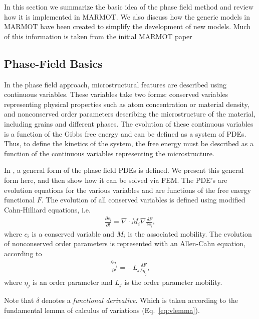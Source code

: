 \documentclass[letter,12pt,fleqn]{article}
\begin{document}
In this section we summarize the basic idea of the phase field method and review how it is implemented in MARMOT. We also discuss how the generic models in MARMOT have been created to simplify the development of new models. Much of this information is taken from the initial MARMOT paper \cite{tonks2011marmot}

\subsection{Phase-Field Basics}
\label{sec:phasefield}

In the phase field approach, microstructural features are described using continuous variables.  These variables take two forms: conserved variables representing physical properties such as atom concentration or material density, and nonconserved order parameters describing the microstructure of the material, including grains and different phases.  The evolution of these continuous variables is a function of the Gibbs free energy and can be defined as a system of PDEs. Thus, to define the kinetics of the system, the free energy must be described as a function of the continuous variables representing the microstructure. 
 
In \citet{chen2002}, a general form of the phase field PDEs is defined.  We present this general form here, and then show how it can be solved via FEM.  The PDE's are evolution equations for the various variables and are functions of the free energy functional $F$.  The evolution of all conserved variables is defined using modified Cahn-Hilliard equations, i.e.
\begin{eqnarray}
	\frac{\partial c_i}{\partial t} = \nabla \cdot M_i \nabla \frac{\delta F}{\delta c_i}, \label{eq:CH}
\end{eqnarray} 
where $c_i$ is a conserved variable and $M_i$ is the associated mobility.  The evolution of nonconserved order parameters is represented with an Allen-Cahn equation, according to
\begin{eqnarray}
	\frac{\partial \eta_j}{\partial t} = - L_j \frac{\delta F}{\delta \eta_j}, \label{eq:AC}
\end{eqnarray}
where $\eta_j$ is an order parameter and $L_j$ is the order parameter mobility.   

Note that $\delta$ denotes a \emph{functional derivative}. Which is taken according to the fundamental lemma of calculus of variations (Eq.~\eqref{eq:vlemma}).
\end{document}
